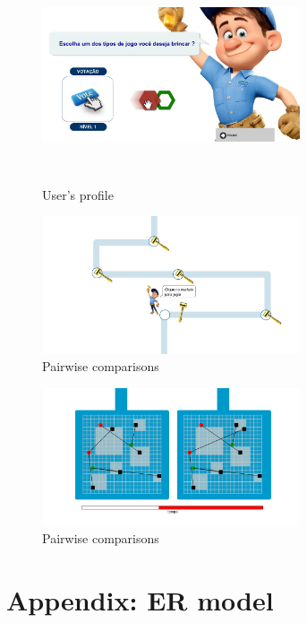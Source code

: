 \documentclass{llncs}
\begin{document}
\begin{figure}
\centering
\includegraphics[height=2.5in,width=3in]{pelocano3.png}
\caption{User's profile }
\label{fig:pelocano3}
\end{figure}
\FloatBarrier

\begin{figure}
\centering
\includegraphics[height=1.6in,width=3in]{pelocano5.png}
\caption{Pairwise comparisons}
\label{fig:pelocano1}
\end{figure}
\FloatBarrier

\begin{figure}
\centering
\includegraphics[height=1.6in,width=3in]{pelocano6.png}
\caption{Pairwise comparisons}
\label{fig:pelocano1}
\end{figure}
\FloatBarrier

\section{Appendix: ER model}
\end{document}
